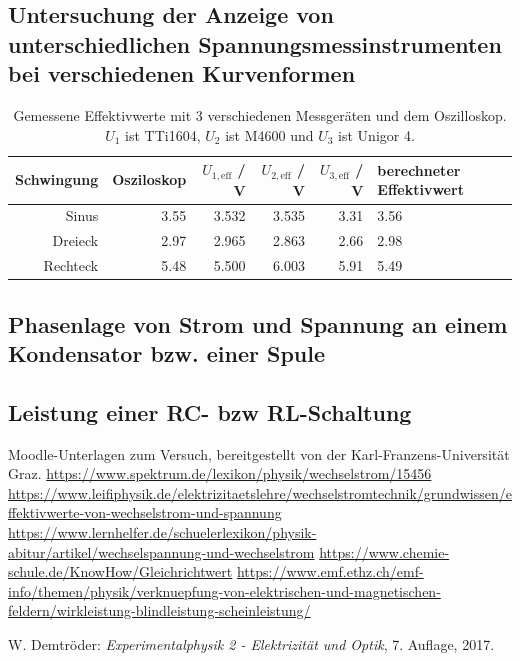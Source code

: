 \documentclass{article}
\begin{document}
\subsection{Untersuchung  der  Anzeige  von  unterschiedlichen  Spannungsmessinstrumenten  bei verschiedenen Kurvenformen }


\begin{table}[H]
\centering
\caption{Gemessene Effektivwerte mit 3 verschiedenen Messgeräten und dem Oszilloskop. $U_1$ ist TTi1604, $U_2$ ist M4600 und $U_3$ ist Unigor 4.}
\label{tab:task1_final}
\begin{tabular}{r|rrrr|p{2cm}}
Schwingung & Oszi\-loskop & $U_{1,\text{eff}}$ / V  & $U_{2,\text{eff}}$ / V & $U_{3,\text{eff}}$ / V & berechneter Effektivwert\\
\hline
Sinus & 3.55 & 3.532 & 3.535 & 3.31 & \hfill3.56\\
Dreieck & 2.97 & 2.965 & 2.863 & 2.66 & \hfill2.98 \\
Rechteck & 5.48 & 5.500 & 6.003 & 5.91 & \hfill5.49
\end{tabular}
\end{table}



\subsection{Phasenlage von Strom und Spannung an einem Kondensator bzw. einer Spule}


\subsection{Leistung einer RC- bzw RL-Schaltung}




\begin{thebibliography}{9}
 Moodle-Unterlagen zum Versuch, bereitgestellt von der Karl-Franzens-Universität Graz.
 \url{https://www.spektrum.de/lexikon/physik/wechselstrom/15456}
 \url{https://www.leifiphysik.de/elektrizitaetslehre/wechselstromtechnik/grundwissen/effektivwerte-von-wechselstrom-und-spannung}
 \url{https://www.lernhelfer.de/schuelerlexikon/physik-abitur/artikel/wechselspannung-und-wechselstrom}
 \url{https://www.chemie-schule.de/KnowHow/Gleichrichtwert}
 \url{https://www.emf.ethz.ch/emf-info/themen/physik/verknuepfung-von-elektrischen-und-magnetischen-feldern/wirkleistung-blindleistung-scheinleistung/}

 W. Demtröder: \emph{Experimentalphysik 2 - Elektrizität  und Optik}, 7. Auflage, 2017.
\end{thebibliography}
\end{document}
